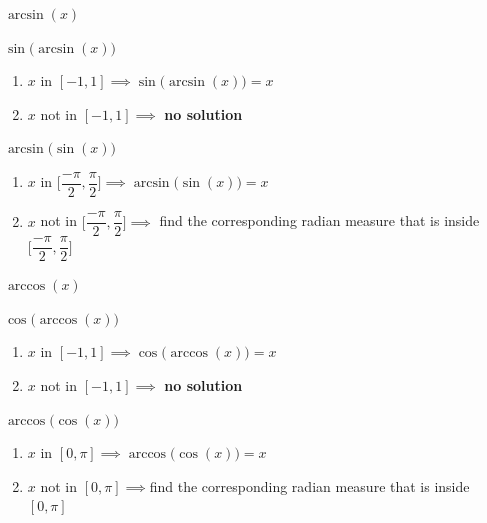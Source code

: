 \documentclass[12pt]{article}
\newenvironment{myindentpar}[1]%
     {\begin{list}{}%
             {\setlength{\leftmargin}{#1}}%
             \item[]%
     }
     {\end{list}}
\begin{document}
\begin{myindentpar}{1cm}
\begin{enumerate}

\item $\arcsin(x)$
\begin{myindentpar}{1cm}
\begin{enumerate}
\item $\sin\Big(\arcsin(x)\Big)$
\begin{myindentpar}{1cm}
\begin{enumerate}
\item $x$ in $[-1, 1]  \implies \sin\Big(\arcsin(x)\Big) = x$ 
\item  $x$  not in $[-1, 1] \implies$ \textbf{no solution}
\end{enumerate}
\end{myindentpar}
\item $\arcsin\Big(\sin(x)\Big)$
\begin{myindentpar}{1cm}
\begin{enumerate}
\item $x$ in $\Big[\dfrac{-\pi}{2}, \dfrac{\pi}{2}\Big] \implies \arcsin\Big(\sin(x)\Big) = x$ 
\item  $x$ not in $\Big[\dfrac{-\pi}{2}, \dfrac{\pi}{2}\Big] \implies$ find the corresponding radian measure that is inside $\Big[\dfrac{-\pi}{2}, \dfrac{\pi}{2}\Big]$
\end{enumerate}
\end{myindentpar}
\end{enumerate}
\end{myindentpar}

\item $\arccos(x)$
\begin{myindentpar}{1cm}
\begin{enumerate}
\item $\cos\Big(\arccos(x)\Big)$
\begin{myindentpar}{1cm}
\begin{enumerate}
\item $x$ in $[-1, 1] \implies \cos\Big(\arccos(x)\Big) = x$ 
\item  $x$ not in $[-1, 1] \implies $ \textbf{no solution}
\end{enumerate}
\end{myindentpar}
\item $\arccos\Big(\cos(x)\Big)$
\begin{myindentpar}{1cm}
\begin{enumerate}
\item $x$ in $[0, \pi] \implies \arccos\Big(\cos(x)\Big) = x$ 
\item  $x$ not in $[0, \pi] \implies $find the corresponding radian measure that is inside $[0, \pi]$
\end{enumerate}
\end{myindentpar}
\end{enumerate}
\end{myindentpar}


\end{enumerate}
\end{myindentpar}
\end{document}

